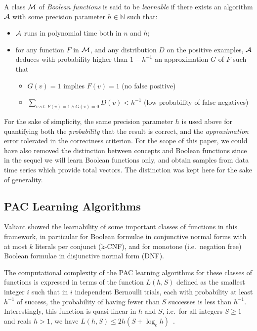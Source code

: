\documentclass{llncs}
\begin{document}
\begin{definition}\label{def:learnclass}
   A class $\cal M$ of \emph{Boolean functions} is said to be \emph{learnable}
   if there exists an algorithm $\cal A$ with some precision parameter $h\in\mathbb N$ such that:
   \begin{itemize}
      \item $\cal A$ runs in polynomial time both in $n$ and $h$;
      \item
         for any function $F$ in $\cal M$, and any distribution $D$ on the positive examples,
         $\cal A$ deduces with probability higher than $1-h^{-1}$ an approximation $G$ of $F$ such that
         \begin{itemize}
            \item $G(v)=1$ implies $F(v)=1$ (no false positive)
            \item
               $\displaystyle\sum_{v\ s.t.\ F(v)=1\wedge G(v)=0} D(v) < h^{-1}$ (low probability of false negatives)
         \end{itemize}
   \end{itemize}
\end{definition}

For the sake of simplicity, the same precision parameter $h$ is used above for quantifying both the \emph{probability} that the result is correct,
and the \emph{approximation} error tolerated in the correctness criterion.
For the scope of this paper, we could have also removed the distinction between concepts and Boolean functions
since in the sequel we will learn Boolean functions only, and obtain samples from data time series which provide total vectors.
The distinction was kept here for the sake of generality.

\subsection{PAC Learning Algorithms}

Valiant showed the learnability of some important classes of functions in this framework,
in particular for Boolean formulae in conjunctive normal forms with at most $k$ literals per conjunct (k-CNF),
and for monotone (i.e.~negation free) Boolean formulae in disjunctive normal form (DNF).

The computational complexity of the PAC learning algorithms for these classes of functions is expressed in terms of the function
$L(h,S)$ defined as the smallest integer $i$ such that
in $i$ independent Bernoulli trials, each with probability at least $h^{-1}$ of success, the probability of having fewer than $S$ successes is less than $h^{-1}$.
Interestingly, this function is quasi-linear in $h$ and $S$, i.e.~for all
integers $S\ge 1$ and reals $h>1$, we have $L(h,S) \le 2h(S+\log_e h)$~\cite{Valiant84cacm}.
\end{document}
